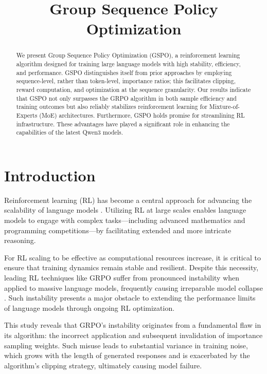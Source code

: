 \title{Group Sequence Policy Optimization}

\begin{abstract}
We present Group Sequence Policy Optimization (GSPO), a reinforcement learning algorithm designed for training large language models with high stability, efficiency, and performance. GSPO distinguishes itself from prior approaches by employing sequence-level, rather than token-level, importance ratios; this facilitates clipping, reward computation, and optimization at the sequence granularity. Our results indicate that GSPO not only surpasses the GRPO algorithm in both sample efficiency and training outcomes but also reliably stabilizes reinforcement learning for Mixture-of-Experts (MoE) architectures. Furthermore, GSPO holds promise for streamlining RL infrastructure. These advantages have played a significant role in enhancing the capabilities of the latest Qwen3 models.
\end{abstract}

\section{Introduction}
\label{sec:intro}

Reinforcement learning (RL) has become a central approach for advancing the scalability of language models \citep{o1,dpsk-r1,qwq32b,qwen3}. Utilizing RL at large scales enables language models to engage with complex tasks—including advanced mathematics and programming competitions—by facilitating extended and more intricate reasoning.

For RL scaling to be effective as computational resources increase, it is critical to ensure that training dynamics remain stable and resilient. Despite this necessity, leading RL techniques like GRPO \citep{grpo} suffer from pronounced instability when applied to massive language models, frequently causing irreparable model collapse \citep{qwen3, minimax-m1}. Such instability presents a major obstacle to extending the performance limits of language models through ongoing RL optimization.

This study reveals that GRPO's instability originates from a fundamental flaw in its algorithm: the incorrect application and subsequent invalidation of importance sampling weights. Such misuse leads to substantial variance in training noise, which grows with the length of generated responses and is exacerbated by the algorithm's clipping strategy, ultimately causing model failure.

